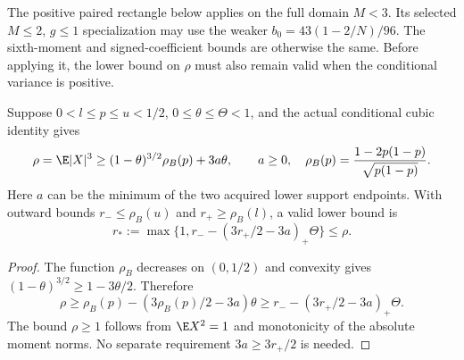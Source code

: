 The positive paired rectangle below applies on the full domain $M<3$.
Its selected $M\le2$, $g\le1$ specialization may use the weaker
$b_0=43(1-2/N)/96$. The sixth-moment and signed-coefficient bounds
are otherwise the same. Before applying it, the lower bound on $\rho$
must also remain valid when the conditional variance is positive.

\begin{proposition}
Suppose $0<l\le p\le u<1/2$, $0\le\theta\le\Theta<1$, and the actual
conditional cubic identity gives
\[
 \rho=\E|X|^3\ge(1-\theta)^{3/2}\rho_B(p)+3a\theta,
 \qquad a\ge0,\quad
 \rho_B(p)=\frac{1-2p(1-p)}{\sqrt{p(1-p)}}.
\]
Here $a$ can be the minimum of the two acquired lower support endpoints.
With outward bounds $r_-\le\rho_B(u)$ and $r_+\ge\rho_B(l)$, a valid
lower bound is
\[
 r_*:=\max\{1,r_--(3r_+/2-3a)_+\Theta\}\le\rho.
\]
\end{proposition}
\begin{proof}
The function $\rho_B$ decreases on $(0,1/2)$ and convexity gives
$(1-\theta)^{3/2}\ge1-3\theta/2$. Therefore
\[
 \rho\ge\rho_B(p)-(3\rho_B(p)/2-3a)\theta
 \ge r_--(3r_+/2-3a)_+\Theta.
\]
The bound $\rho\ge1$ follows from $\E X^2=1$ and monotonicity of the
absolute moment norms. No separate requirement $3a\ge3r_+/2$ is needed.
\end{proof}


